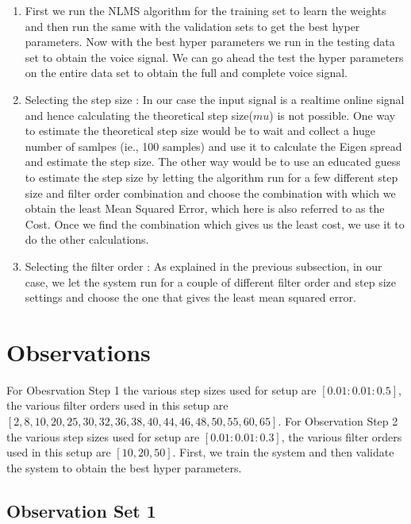 \documentclass[conference]{IEEEtran}
\begin{document}
\begin{enumerate}
\item First we run the NLMS algorithm for the training set to learn the weights and then run the same with the validation sets to get the best hyper parameters. Now with the best hyper parameters we run in the testing data set to obtain the voice signal. We can go ahead the test the hyper parameters on the entire data set to obtain the full and complete voice signal.

\item Selecting the step size : In our case the input signal is a realtime online signal and hence calculating the theoretical step size($mu$) is not possible. One way to estimate the theoretical step size would be to wait and collect a huge number of samlpes (ie., 100 samples) and use it to calculate the Eigen spread and estimate the step size. The other way would be to use an educated guess to estimate the step size by letting the algorithm run for a few different step size and filter order combination and choose the combination with which we obtain the least Mean Squared Error, which here is also referred to as the Cost. Once we find the combination which gives us the least cost, we use it to do the other calculations.


\item Selecting the filter order : As explained in the previous subsection, in our case, we let the system run for a couple of different filter order and step size settings and choose the one that gives the least mean squared error.

\end{enumerate}
 
\section{Observations}

For Obesrvation Step 1 the various step sizes used for setup are $[0.01:0.01:0.5]$, the various filter orders used in this setup are $[2,8,10,20,25,30,32,36,38,40,44,46,48,50,55,60,65]$.  For Observation Step 2 the various step sizes used for setup are $[0.01:0.01:0.3]$, the various filter orders used in this setup are $[10,20,50]$. First, we train the system and then validate the system to obtain the best hyper parameters. 

\subsection{Observation Set 1}
\end{document}
